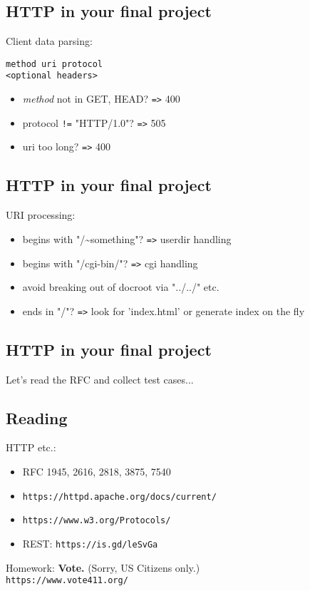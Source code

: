 \documentclass[xga]{xdvislides}
\begin{document}
\subsection{HTTP in your final project}
Client data parsing: \\
\begin{verbatim}
method uri protocol
<optional headers>

\end{verbatim}
\begin{itemize}
	\item {\em method} not in GET, HEAD? \verb+=>+ 400
	\item protocol \verb+!=+ "HTTP/1.0"? \verb+=>+ 505
	\item uri too long? \verb+=>+ 400
\end{itemize}

\subsection{HTTP in your final project}
URI processing:
\begin{itemize}
	\item begins with "/\~{}something"? \verb+=>+ userdir handling
	\item begins with "/cgi-bin/"? \verb+=>+ cgi handling
	\item avoid breaking out of docroot via "../../" etc.
	\item ends in "/"? \verb+=>+ look for 'index.html' or generate index on the fly
\end{itemize}

\subsection{HTTP in your final project}
Let's read the RFC and collect test cases...


\subsection{Reading}
HTTP etc.:
\begin{itemize}
	\item RFC 1945, 2616, 2818, 3875, 7540
	\item \verb+https://httpd.apache.org/docs/current/+
	\item \verb+https://www.w3.org/Protocols/+
	\item REST: \verb+https://is.gd/leSvGa+
\end{itemize}
\vspace{.5in}
Homework: {\bf Vote.} (Sorry, US Citizens only.) \\
{\tt https://www.vote411.org/}
\end{document}
